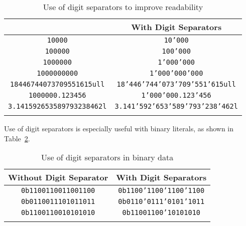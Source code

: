 \begin{table}[h!]
\begin{center}
\begin{threeparttable}
\caption{Use of digit separators to improve readability}\label{digitseparator-table1}\vspace{1.5ex}
{\small \begin{tabular}{c|c}\thickhline
\rowcolor[gray]{.9}{\sffamily\bfseries Without Digit Separator} & {\sffamily\bfseries With Digit Separators} \\ \hline
\texttt{10000} & \texttt{10'000} \\ \hline 
\texttt{100000} & \texttt{100'000} \\ \hline 
\texttt{1000000} & \texttt{1'000'000} \\ \hline 
\texttt{1000000000} & \texttt{1'000'000'000} \\ \hline
\texttt{18446744073709551615ull} & \texttt{18'446'744'073'709'551'615ull} \\ \hline 
\texttt{1000000.123456} & \texttt{1'000'000.123'456} \\ \hline 
\texttt{3.141592653589793238462l} & \texttt{3.141'592'653'589'793'238'462l} \\ \thickhline
\end{tabular}
} %
\end{threeparttable}
\end{center} 
\end{table} 
\noindent Use of digit separators is especially useful with binary
literals, as shown in Table~\ref{digitseparator-table2}.\begin{table}[h!]
\begin{center}
\begin{threeparttable}
\caption{Use of digit separators in binary data}\label{digitseparator-table2}\vspace{1.5ex}
{\small \begin{tabular}{c|c}
\thickhline
\rowcolor[gray]{.9} {\sffamily\bfseries Without Digit Separator} & {\sffamily\bfseries With Digit Separators} \\\hline
\texttt{0b1100110011001100} & \texttt{0b1100'1100'1100'1100} \\ \hline
\texttt{0b0110011101011011} & \texttt{0b0110'0111'0101'1011} \\ \hline
\texttt{0b1100110010101010} & \texttt{0b11001100'10101010} \\
\thickhline
\end{tabular}
} %
\end{threeparttable}
\end{center}
\end{table}

